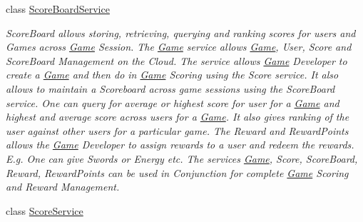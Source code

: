 \begin{DoxyCompactItemize}
class \hyperlink{classcom_1_1shephertz_1_1app42_1_1paas_1_1sdk_1_1csharp_1_1game_1_1_score_board_service}{Score\+Board\+Service}
\begin{DoxyCompactList}\small\item\em Score\+Board allows storing, retrieving, querying and ranking scores for users and Games across \hyperlink{classcom_1_1shephertz_1_1app42_1_1paas_1_1sdk_1_1csharp_1_1game_1_1_game}{Game} Session. The \hyperlink{classcom_1_1shephertz_1_1app42_1_1paas_1_1sdk_1_1csharp_1_1game_1_1_game}{Game} service allows \hyperlink{classcom_1_1shephertz_1_1app42_1_1paas_1_1sdk_1_1csharp_1_1game_1_1_game}{Game}, User, Score and Score\+Board Management on the Cloud. The service allows \hyperlink{classcom_1_1shephertz_1_1app42_1_1paas_1_1sdk_1_1csharp_1_1game_1_1_game}{Game} Developer to create a \hyperlink{classcom_1_1shephertz_1_1app42_1_1paas_1_1sdk_1_1csharp_1_1game_1_1_game}{Game} and then do in \hyperlink{classcom_1_1shephertz_1_1app42_1_1paas_1_1sdk_1_1csharp_1_1game_1_1_game}{Game} Scoring using the Score service. It also allows to maintain a Scoreboard across game sessions using the Score\+Board service. One can query for average or highest score for user for a \hyperlink{classcom_1_1shephertz_1_1app42_1_1paas_1_1sdk_1_1csharp_1_1game_1_1_game}{Game} and highest and average score across users for a \hyperlink{classcom_1_1shephertz_1_1app42_1_1paas_1_1sdk_1_1csharp_1_1game_1_1_game}{Game}. It also gives ranking of the user against other users for a particular game. The Reward and Reward\+Points allows the \hyperlink{classcom_1_1shephertz_1_1app42_1_1paas_1_1sdk_1_1csharp_1_1game_1_1_game}{Game} Developer to assign rewards to a user and redeem the rewards. E.\+g. One can give Swords or Energy etc. The services \hyperlink{classcom_1_1shephertz_1_1app42_1_1paas_1_1sdk_1_1csharp_1_1game_1_1_game}{Game}, Score, Score\+Board, Reward, Reward\+Points can be used in Conjunction for complete \hyperlink{classcom_1_1shephertz_1_1app42_1_1paas_1_1sdk_1_1csharp_1_1game_1_1_game}{Game} Scoring and Reward Management. \end{DoxyCompactList}\item 
class \hyperlink{classcom_1_1shephertz_1_1app42_1_1paas_1_1sdk_1_1csharp_1_1game_1_1_score_service}{Score\+Service}

\end{DoxyCompactItemize}
